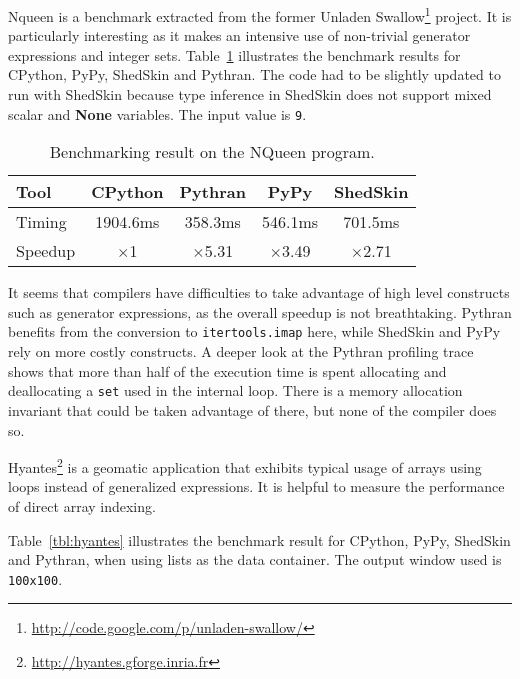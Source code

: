 \documentclass[10pt, onecolumn, preprint]{sigplanconf}
\begin{document}
Nqueen is a benchmark extracted from the former Unladen Swallow\footnote{\url{http://code.google.com/p/unladen-swallow/}} project. It
is particularly interesting as it makes an intensive use of non-trivial
generator expressions and integer sets. Table~\ref{tbl:nqueen} illustrates
the benchmark results for CPython, PyPy, ShedSkin and Pythran. The code had to
be slightly updated to run with ShedSkin because type inference in ShedSkin does
not support mixed scalar and \textbf{None} variables. The input value is \texttt{9}.

\begin{table}
    \centering

    \begin{tabular}{|l|c|c|c|c|}
        \hline
     Tool    &  CPython    &   Pythran     &     PyPy   &  ShedSkin \\
    \hline
     Timing  &  1904.6ms   &   358.3ms     &    546.1ms &  701.5ms  \\
    \hline
     Speedup &  $\times$1         &    $\times$5.31      &    $\times$3.49   &  $\times$2.71    \\
    \hline
\end{tabular}
\caption{Benchmarking result on the NQueen program.}
\label{tbl:nqueen}

\end{table}

It seems that compilers have difficulties to take advantage of high level
constructs such as generator expressions, as the overall speedup is not
breathtaking. Pythran benefits from the conversion to \texttt{itertools.imap} here,
while ShedSkin and PyPy rely on more costly constructs. A deeper look at the
Pythran profiling trace shows that more than half of the execution time is
spent allocating and deallocating a \texttt{set} used in the internal loop. There is a
memory allocation invariant that could be taken advantage of there, but none of
the compiler does so.

Hyantes\footnote{\url{http://hyantes.gforge.inria.fr}} is a geomatic application that exhibits typical usage of arrays
using loops instead of generalized expressions. It is helpful to measure the
performance of direct array indexing.

Table~\ref{tbl:hyantes} illustrates the benchmark result for CPython, PyPy,
ShedSkin and Pythran, when using lists as the data container. The output window
used is \texttt{100x100}.
\end{document}
